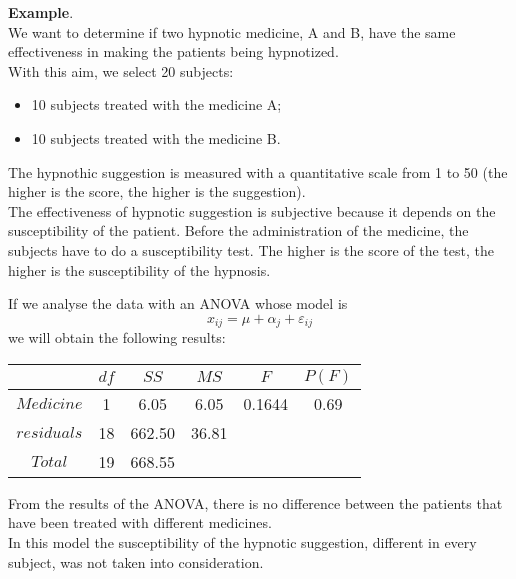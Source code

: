 \begin{frame}
  \vspace{.25cm}
  \textbf{Example}.\\
  We want to determine if two hypnotic medicine, A and B, have the same effectiveness in making the patients being hypnotized.\\
  With this aim, we select 20 subjects:
  \begin{itemize}
    \item 10 subjects treated with the medicine A;
    \item 10 subjects treated with the medicine B.
  \end{itemize}
  The hypnothic suggestion is measured with a quantitative scale from 1 to 50 (the higher is the score, the higher is the suggestion).\\
  The effectiveness of hypnotic suggestion is subjective because it depends on the susceptibility of the patient. Before the administration of the medicine, the subjects have to do a susceptibility test. The higher is the score of the test, the higher is the susceptibility of the hypnosis.
\end{frame}

\begin{frame}
  If we analyse the data with an ANOVA whose model is
  \vspace{-0.2cm} $$ x_{ij} = \mu + \alpha_j + \varepsilon_{ij} $$
  we will obtain the following results:\\
  \vspace{0.3cm}
  \begin{center}
    \begin{tabular}{|c|c|c|c|c|c|}
      \hline
                  & $df$ & $SS$   & $MS$  & $F$    & $P(F)$  \\ \hline
      $Medicine$   & 1    & 6.05   & 6.05  & 0.1644 & 0.69    \\ \hline
      $residuals$ & 18   & 662.50 & 36.81 &        &         \\ \hline
      $Total$    & 19   & 668.55 &       &        &         \\ \hline
    \end{tabular}   
  \end{center}
  From the results of the ANOVA, there is no difference between the patients that have been treated with different medicines.\\
  In this model the susceptibility of the hypnotic suggestion, different in every subject, was not taken into consideration.
\end{frame}

